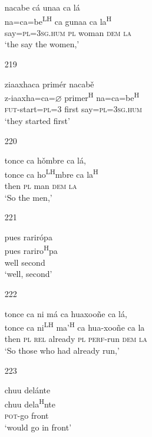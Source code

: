 \begin{itemize}
\glll   nacabe c\'{a} unaa ca l\'{a}\\
na=ca=be\textsuperscript{LH} ca gunaa ca la\textsuperscript{H}\\
say=\textsc{pl}=\textsc{3sg.hum} \textsc{pl} woman \textsc{dem} \textsc{la}\\
\glt `the say the women,'
 


\item[219]
 
\glll   ziaaxhaca prim\'{e}r nacab\v{e}\\
z-iaaxha=ca=$\varnothing$ primer\textsuperscript{H} na=ca=be\textsuperscript{H}\\
\textsc{fut}-start=\textsc{pl}=\textsc{3} first say=\textsc{pl}=\textsc{3sg.hum} \\
\glt `they started first'
 



\item[220]
 
\glll   tonce ca h\v{o}mbre ca l\'{a},\\
 tonce ca ho\textsuperscript{LH}mbre ca la\textsuperscript{H}\\
 then \textsc{pl} man \textsc{dem} \textsc{la}\\
\glt `So the men,'
 


\item[221]
 
\glll   pues rarir\'{o}pa\\
pues rariro\textsuperscript{H}pa\\
 well second\\
\glt `well, second'
 


\item[222]
 
\glll   tonce ca ni m\'{a} ca huaxoo\~{n}e ca l\'{a},\\
  tonce ca ni\textsuperscript{LH} ma'\textsuperscript{H} ca hua-xoo\~{n}e ca la\\
  then \textsc{pl} \textsc{rel} already \textsc{pl} \textsc{perf}-run \textsc{dem} \textsc{la}\\
\glt `So those who had already run,'
 


\item[223]
 
\glll   chuu del\'{a}nte \\
  chuu dela\textsuperscript{H}nte \\
    \textsc{pot}-go front\\
\glt `would go in front'
 



\end{itemize}
